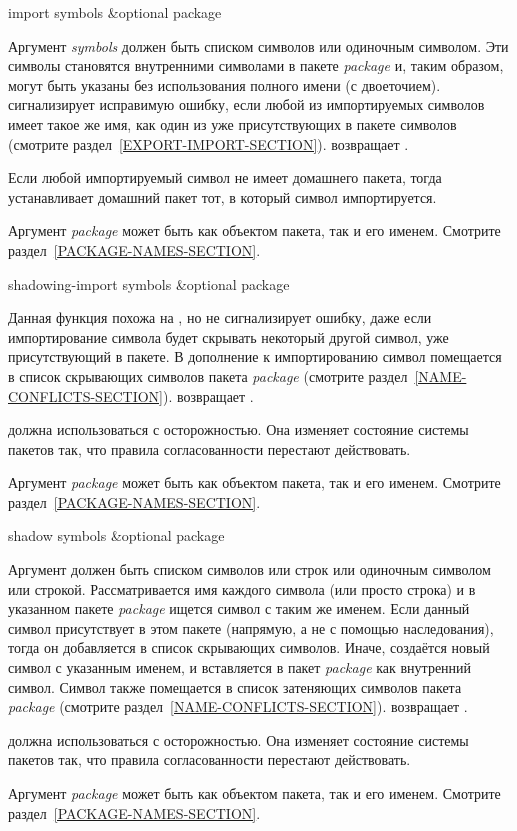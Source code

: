 \begin{defun}[Функция]
import symbols &optional package

Аргумент \emph{symbols} должен быть списком символов или одиночным символом.
Эти символы становятся внутренними символами в пакете \emph{package} и, таким
образом, могут быть указаны без использования полного имени (с двоеточием).
 сигнализирует исправимую ошибку, если любой из импортируемых
символов имеет такое же имя, как один из уже присутствующих в пакете символов
(смотрите раздел~\ref{EXPORT-IMPORT-SECTION}).
 возвращает {\true}.

Если любой импортируемый символ не имеет домашнего пакета, тогда 
устанавливает домашний пакет тот, в который символ импортируется. 

Аргумент \emph{package} может быть как объектом пакета, так и его
именем. Смотрите раздел~\ref{PACKAGE-NAMES-SECTION}.
\end{defun}

\begin{defun}[Функция]
shadowing-import symbols &optional package

Данная функция похожа на , но не сигнализирует ошибку, даже если
импортирование символа будет скрывать некоторый другой символ, уже
присутствующий в пакете. В дополнение к импортированию символ помещается в
список скрывающих символов пакета \emph{package} (смотрите
раздел~\ref{NAME-CONFLICTS-SECTION}).
 возвращает {\true}.

 должна использоваться с осторожностью. Она изменяет
состояние системы пакетов так, что правила согласованности перестают действовать.

Аргумент \emph{package} может быть как объектом пакета, так и его
именем. Смотрите раздел~\ref{PACKAGE-NAMES-SECTION}.
\end{defun}

\begin{defun}[Функция]
shadow symbols &optional package

Аргумент должен быть списком символов или строк или одиночным символом или строкой.
Рассматривается имя каждого символа (или просто строка) и в указанном
пакете \emph{package} ищется символ с таким же именем. Если данный символ
присутствует в этом пакете (напрямую, а не с помощью наследования), тогда он
добавляется в список скрывающих символов. Иначе, создаётся новый символ с
указанным именем, и вставляется в пакет \emph{package} как внутренний
символ. Символ также помещается в список затеняющих символов пакета
\emph{package} (смотрите раздел~\ref{NAME-CONFLICTS-SECTION}).
 возвращает {\true}.

 должна использоваться с осторожностью. Она изменяет
состояние системы пакетов так, что правила согласованности перестают действовать.

Аргумент \emph{package} может быть как объектом пакета, так и его
именем. Смотрите раздел~\ref{PACKAGE-NAMES-SECTION}.
\end{defun}

